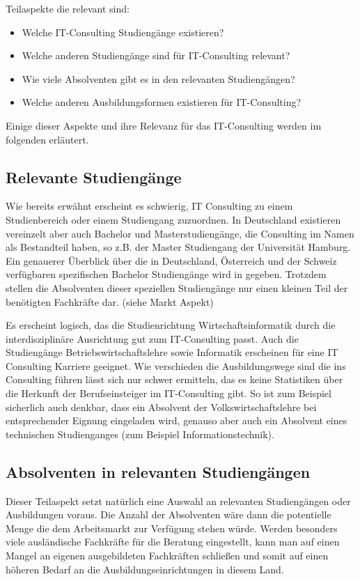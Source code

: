 Teilaspekte die relevant sind:
\begin{itemize} 
\item Welche IT-Consulting Studiengänge existieren?
\item Welche anderen Studiengänge sind für IT-Consulting relevant?
\item Wie viele Absolventen gibt es in den relevanten Studiengängen?
\item Welche anderen Ausbildungsformen existieren für IT-Consulting?
\end{itemize}

Einige dieser Aspekte und ihre Relevanz für das IT-Consulting werden im folgenden erläutert.

\subsection{Relevante Studiengänge}
Wie bereits erwähnt erscheint es schwierig, IT Consulting zu einem Studienbereich oder einem Studiengang zuzuordnen. 
In Deutschland existieren vereinzelt aber auch Bachelor und Masterstudiengänge, die Consulting im Namen als Bestandteil haben, so z.B. der Master Studiengang der Universität Hamburg. Ein genauerer Überblick über die in Deutschland, Österreich und der Schweiz verfügbaren spezifischen Bachelor Studiengänge wird in \cite{NissenKlaukDeelmannMohe201209} gegeben. Trotzdem stellen die Absolventen dieser speziellen Studiengänge nur einen kleinen Teil der benötigten Fachkräfte dar. (siehe Markt Aspekt)

Es erscheint logisch, das die Studienrichtung Wirtschaftsinformatik durch die interdisziplinäre Ausrichtung gut zum IT-Consulting passt. Auch die Studiengänge Betriebswirtschaftslehre sowie Informatik erscheinen für eine IT Consulting Karriere geeignet. Wie verschieden die Ausbildungswege sind die ins Consulting führen lässt sich nur schwer ermitteln, das es keine Statistiken über die Herkunft der Berufseinsteiger im IT-Consulting gibt.
So ist zum Beispiel sicherlich auch denkbar, dass ein Absolvent der Volkswirtschaftslehre bei entsprechender Eignung eingeladen wird, genauso aber auch ein Absolvent eines technischen Studienganges (zum Beispiel Informationstechnik).

\subsection{Absolventen in relevanten Studiengängen}
Dieser Teilaspekt setzt natürlich eine Auswahl an relevanten Studiengängen oder Ausbildungen voraus. Die Anzahl der Absolventen wäre dann die potentielle Menge die dem Arbeitsmarkt zur Verfügung stehen würde. Werden besonders viele ausländische Fachkräfte für die Beratung eingestellt, kann man auf einen Mangel an eigenen ausgebildeten Fachkräften schließen und somit auf einen höheren Bedarf an die Ausbildungseinrichtungen in diesem Land.

